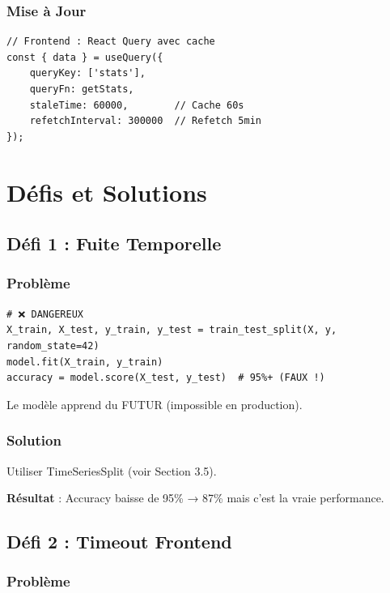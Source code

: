 \documentclass[12pt,a4paper,french]{article}
\begin{document}
\subsubsection{Mise à Jour}

\begin{lstlisting}
// Frontend : React Query avec cache
const { data } = useQuery({
    queryKey: ['stats'],
    queryFn: getStats,
    staleTime: 60000,        // Cache 60s
    refetchInterval: 300000  // Refetch 5min
});
\end{lstlisting}

\section{Défis et Solutions}

\subsection{Défi 1 : Fuite Temporelle}

\subsubsection{Problème}

\begin{lstlisting}
# ❌ DANGEREUX
X_train, X_test, y_train, y_test = train_test_split(X, y, random_state=42)
model.fit(X_train, y_train)
accuracy = model.score(X_test, y_test)  # 95%+ (FAUX !)
\end{lstlisting}

Le modèle apprend du FUTUR (impossible en production).

\subsubsection{Solution}

Utiliser TimeSeriesSplit (voir Section 3.5).

\textbf{Résultat} : Accuracy baisse de 95\% → 87\% mais c'est la vraie performance.

\subsection{Défi 2 : Timeout Frontend}

\subsubsection{Problème}
\end{document}
